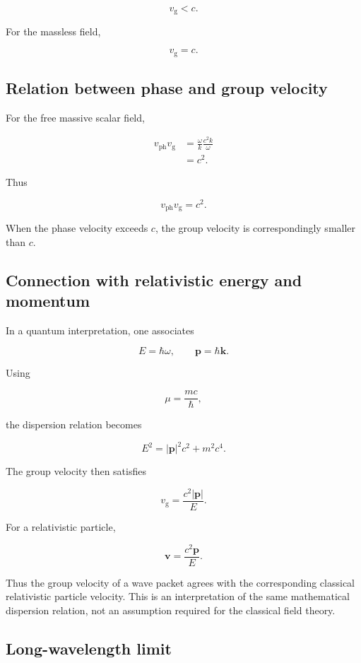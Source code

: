 \[
\boxed{
v_{\mathrm{g}}<c}.
\]

For the massless field,

\[
v_{\mathrm{g}}=c.
\]

\subsection{Relation between phase and group velocity}

For the free massive scalar field,

\[
\begin{aligned}
v_{\mathrm{ph}}v_{\mathrm{g}}
&=
\frac{\omega}{k}
\frac{c^{2}k}{\omega}\\
&=
c^{2}.
\end{aligned}
\]

Thus

\[
\boxed{
v_{\mathrm{ph}}v_{\mathrm{g}}=c^{2}
}.
\]

When the phase velocity exceeds \(c\), the group velocity is correspondingly smaller than \(c\).

\subsection{Connection with relativistic energy and momentum}

In a quantum interpretation, one associates

\[
E=\hbar\omega,
\qquad
\mathbf{p}=\hbar\mathbf{k}.
\]

Using

\[
\mu=\frac{mc}{\hbar},
\]

the dispersion relation becomes

\[
E^{2}
=
|\mathbf{p}|^{2}c^{2}
+
m^{2}c^{4}.
\]

The group velocity then satisfies

\[
\boxed{
v_{\mathrm{g}}
=
\frac{c^{2}|\mathbf{p}|}{E}
}.
\]

For a relativistic particle,

\[
\mathbf{v}
=
\frac{c^{2}\mathbf{p}}{E}.
\]

Thus the group velocity of a wave packet agrees with the corresponding classical relativistic particle velocity. This is an interpretation of the same mathematical dispersion relation, not an assumption required for the classical field theory.

\subsection{Long-wavelength limit}

